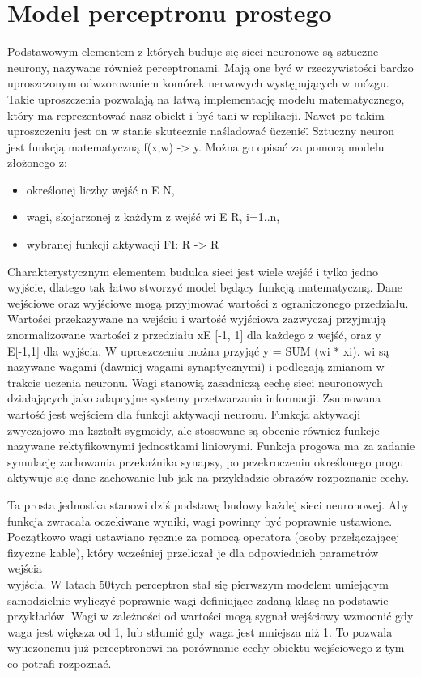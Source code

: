 \documentclass[12pt,a4paper,twoside,titlepage,openright]{book}
\begin{document}
\section{Model perceptronu prostego}
Podstawowym elementem z których buduje się sieci neuronowe są sztuczne neurony, nazywane również perceptronami. Mają one być w rzeczywistości bardzo uproszczonym odwzorowaniem komórek nerwowych występujących w mózgu. Takie uproszczenia pozwalają na łatwą implementację modelu matematycznego, który ma reprezentować nasz obiekt i być tani w replikacji. Nawet po takim uproszczeniu jest on w stanie skutecznie naśladować \"uczenie\".
Sztuczny neuron jest funkcją matematyczną f(x,w) -> y. Można go opisać za pomocą modelu złożonego z:
\begin{itemize}
\item określonej liczby wejść n E N,
\item wagi, skojarzonej z każdym z wejść wi E R, i=1..n,
\item wybranej funkcji aktywacji FI: R -> R
\end{itemize}

Charakterystycznym elementem budulca sieci jest wiele wejść i tylko jedno wyjście, dlatego tak łatwo stworzyć model będący funkcją matematyczną.
Dane wejściowe oraz wyjściowe mogą przyjmować wartości z ograniczonego przedziału. Wartości przekazywane na wejściu i wartość wyjściowa zazwyczaj przyjmują znormalizowane wartości z przedziału xE [-1, 1] dla każdego z wejść, oraz y E[-1,1] dla wyjścia. W uproszczeniu można przyjąć y = SUM (wi * xi). wi są nazywane wagami (dawniej wagami synaptycznymi) i podlegają zmianom w trakcie uczenia neuronu. Wagi stanowią zasadniczą cechę sieci neuronowych działających jako adapcyjne systemy przetwarzania informacji. Zsumowana wartość jest wejściem dla funkcji aktywacji neuronu. Funkcja aktywacji zwyczajowo ma kształt sygmoidy, ale stosowane są obecnie również funkcje nazywane rektyfikownymi jednostkami liniowymi. Funkcja progowa ma za zadanie symulację zachowania przekaźnika synapsy, po przekroczeniu określonego progu aktywuje się dane zachowanie lub jak na przykładzie obrazów rozpoznanie cechy.

Ta prosta jednostka stanowi dziś podstawę budowy każdej sieci neuronowej. Aby funkcja zwracała oczekiwane wyniki, wagi powinny być poprawnie ustawione. Początkowo wagi ustawiano ręcznie za pomocą operatora (osoby przełączającej fizyczne kable), który wcześniej przeliczał je dla odpowiednich parametrów wejścia\\wyjścia. W latach 50tych perceptron stał się pierwszym modelem umiejącym samodzielnie wyliczyć poprawnie wagi definiujące zadaną klasę na podstawie przykładów. Wagi w zależności od wartości mogą sygnał wejściowy wzmocnić gdy waga jest większa od 1, lub stłumić gdy waga jest mniejsza niż 1. To pozwala wyuczonemu już perceptronowi na porównanie cechy obiektu wejściowego z tym co potrafi rozpoznać. 
\end{document}
